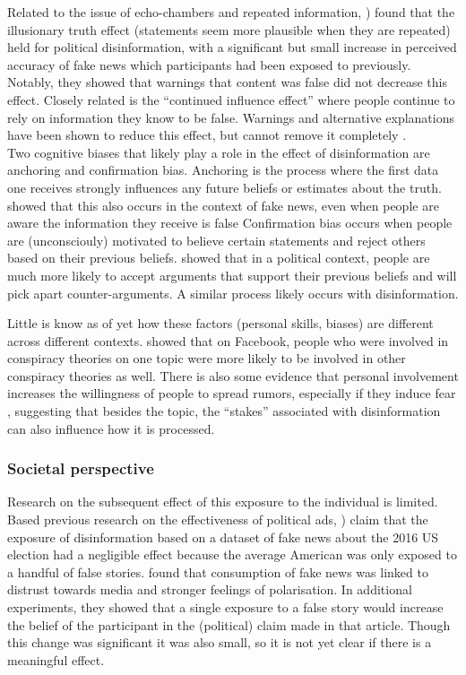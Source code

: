 \documentclass[10pt,a4paper]{article}
\begin{document}
Related to the issue of echo-chambers and repeated information, \cite{Pennycook2018a}) found that the illusionary truth effect (statements seem more plausible when they are repeated) held for political disinformation, with a significant but small increase in perceived accuracy of fake news which participants had been exposed to previously. Notably, they showed that warnings that content was false did not decrease this effect. Closely related is the “continued influence effect” where people continue to rely on information they know to be false. Warnings and alternative explanations have been shown to reduce this effect, but cannot remove it completely \citep{Ecker2010}. \\


Two cognitive biases that likely play a role in the effect of disinformation are anchoring and confirmation bias. Anchoring is the process where the first data one receives strongly influences any future beliefs or estimates about the truth. \cite{jost2020fake} showed that this also occurs in the context of fake news, even when people are aware the information they receive is false Confirmation bias occurs when people are (unconsciouly) motivated to believe certain statements and reject others based on their previous beliefs. \cite{taber2006motivated} showed that in a political context, people are much more likely to accept arguments that support their previous beliefs and will pick apart counter-arguments. A similar process likely occurs with disinformation.

Little is know as of yet how these factors (personal skills, biases) are different across different contexts. \cite{Bessi2015} showed that on Facebook, people who were involved in conspiracy theories on one topic were more likely to be involved in other conspiracy theories as well. There is also some evidence that personal involvement increases the willingness of people to spread rumors, especially if they induce fear \citep{chua2018intentions}, suggesting that besides the topic, the ``stakes'' associated with disinformation can also influence how it is processed.



\subsubsection{Societal perspective}
Research on the subsequent effect of this exposure to the individual is limited. Based previous research on the effectiveness of political ads, \cite{Allcott2017}) claim that the exposure of disinformation based on a dataset of fake news about the 2016 US election had a negligible effect because the average American was only exposed to a handful of false stories. \cite{Guess2020} found that consumption of fake news was linked to distrust towards media and stronger feelings of polarisation. In additional experiments, they showed that a single exposure to a false story would increase the belief of the participant in the (political) claim made in that article. Though this change was significant it was also small, so it is not yet clear if there is a meaningful effect. \\ 
\end{document}
